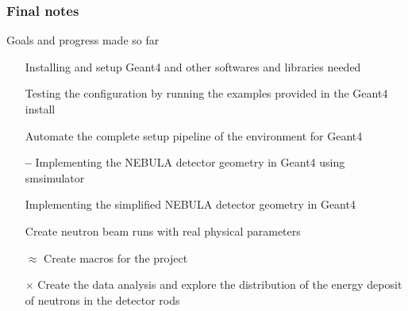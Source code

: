 \begin{frame}
\frametitle{Final notes}

\begin{block}{Goals and progress made so far}
	\begin{itemize}
		\item[{\color{PineGreen} \checkmark}] Installing and setup Geant4 and other softwares and libraries needed
		\item[{\color{PineGreen} \checkmark}] Testing the configuration by running the examples provided in the Geant4 install
		\item[{\color{PineGreen} \checkmark}] Automate the complete setup pipeline of the environment for Geant4
		\item[{\color{red} \textbf{--}}] Implementing the NEBULA detector geometry in Geant4 using smsimulator
		\item[{\color{PineGreen} \checkmark}] Implementing the simplified NEBULA detector geometry in Geant4
		\item[{\color{PineGreen} \checkmark}] Create neutron beam runs with real physical parameters
		\item[{\color{Dandelion} $\approx$}] Create macros for the project
		\item[{\color{red} $\boldsymbol{\times}$}] Create the data analysis and explore the distribution of the energy deposit of neutrons in the detector rods
	\end{itemize}
\end{block}

\end{frame}